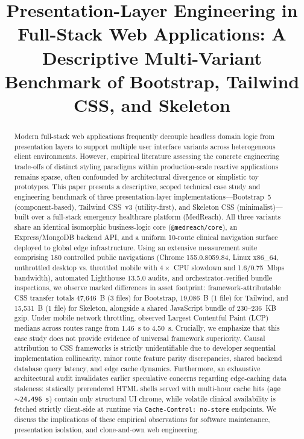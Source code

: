 \documentclass[conference]{IEEEtran}
\begin{document}
\title{Presentation-Layer Engineering in Full-Stack Web Applications: A Descriptive Multi-Variant Benchmark of Bootstrap, Tailwind CSS, and Skeleton}

\author{
}

\maketitle

\begin{abstract}
Modern full-stack web applications frequently decouple headless domain logic from presentation layers to support multiple user interface variants across heterogeneous client environments. However, empirical literature assessing the concrete engineering trade-offs of distinct styling paradigms within production-scale reactive applications remains sparse, often confounded by architectural divergence or simplistic toy prototypes. This paper presents a descriptive, scoped technical case study and engineering benchmark of three presentation-layer implementations---Bootstrap~5 (component-based), Tailwind CSS~v3 (utility-first), and Skeleton CSS (minimalist)---built over a full-stack emergency healthcare platform (MedReach). All three variants share an identical isomorphic business-logic core (\texttt{@medreach/core}), an Express/MongoDB backend API, and a uniform 10-route clinical navigation surface deployed to global edge infrastructure. Using an extensive measurement suite comprising 180 controlled public navigations (Chrome 155.0.8059.84, Linux x86\_64, unthrottled desktop vs. throttled mobile with $4\times$ CPU slowdown and 1.6/0.75~Mbps bandwidth), automated Lighthouse 13.5.0 audits, and orchestrator-verified bundle inspections, we observe marked differences in asset footprint: framework-attributable CSS transfer totals 47,646~B (3 files) for Bootstrap, 19,086~B (1 file) for Tailwind, and 15,531~B (1 file) for Skeleton, alongside a shared JavaScript bundle of 230--236~KB gzip. Under mobile network throttling, observed Largest Contentful Paint (LCP) medians across routes range from 1.46~s to 4.50~s. Crucially, we emphasize that this case study does not provide evidence of universal framework superiority. Causal attribution to CSS frameworks is strictly unidentifiable due to developer sequential implementation collinearity, minor route feature parity discrepancies, shared backend database query latency, and edge cache dynamics. Furthermore, an exhaustive architectural audit invalidates earlier speculative concerns regarding edge-caching data staleness: statically prerendered HTML shells served with multi-hour cache hits (\texttt{age $\sim$24,496~s}) contain only structural UI chrome, while volatile clinical availability is fetched strictly client-side at runtime via \texttt{Cache-Control: no-store} endpoints. We discuss the implications of these empirical observations for software maintenance, presentation isolation, and clone-and-own web engineering.
\end{abstract}
\end{document}
